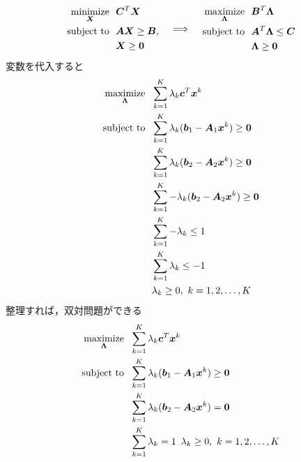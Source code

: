 \documentclass[a4paper,11pt]{jsarticle}
\numberwithin{theorem}{section}  %
\numberwithin{equation}{section} %
\newcommand{\minimize}{\mathop{\mathrm{\rm minimize}}\limits}
\newcommand{\maximize}{\mathop{\mathrm{\rm maximize}}\limits}
\begin{document}
\begin{equation}
\begin{split}
\minimize_{\bm{X}} &\,\,\,\, \bm{C}^T\bm{X}\\
\text{subject to} &\,\,\,\,  \bm{AX} \ge \bm{B}, \\
&\,\,\,\,  \bm{X} \ge \bm{0}
\end{split}
\,\,\,\,\,\,\,
\Longrightarrow
\,\,\,\,\,\,\,
\begin{split}
\maximize_{\bm{\Lambda}} &\,\,\,\, \bm{B}^T\bm{\Lambda} \\
\text{subject to} &\,\,\,\,  \bm{A}^T \bm{\Lambda} \le \bm{C} \\
&\,\,\,\,  \bm{\Lambda} \ge \bm{0} \\
\end{split}
\end{equation}
変数を代入すると
\begin{equation}
\begin{split}
\maximize_{\bm{\Lambda}} &\,\,\,\, \sum_{k=1}^K \lambda_k \bm{c}^T\bm{x}^k    \\
\text{subject to} &\,\,\,\, \sum_{k=1}^K \lambda_k(\bm{b}_1 - \bm{A}_1\bm{x}^k) \ge \bm{0}\\
&\,\,\,\, \sum_{k=1}^K \lambda_k(\bm{b}_2 - \bm{A}_2\bm{x}^k) \ge \bm{0}\\
&\,\,\,\, \sum_{k=1}^K -\lambda_k(\bm{b}_2 - \bm{A}_2\bm{x}^k) \ge \bm{0}\\
&\,\,\,\, \sum_{k=1}^K -\lambda_k \le 1 \\
&\,\,\,\, \sum_{k=1}^K \lambda_k \le -1 \\
&\,\,\,\, \lambda_k \ge 0, \,\, k = 1,2,\dots,K
\end{split}
\end{equation}
整理すれば，双対問題ができる
\begin{equation}
\begin{split}
\maximize_{\bm{\Lambda}} &\,\,\,\, \sum_{k=1}^K \lambda_k \bm{c}^T\bm{x}^k    \\
\text{subject to} &\,\,\,\, \sum_{k=1}^K \lambda_k(\bm{b}_1 - \bm{A}_1\bm{x}^k) \ge \bm{0}\\
&\,\,\,\, \sum_{k=1}^K \lambda_k(\bm{b}_2 - \bm{A}_2\bm{x}^k) = \bm{0}\\
&\,\,\,\, \sum_{k=1}^K \lambda_k = 1 \,\,\, \lambda_k \ge 0, \,\, k = 1,2,\dots,K
\end{split}
\end{equation}
\end{document}
